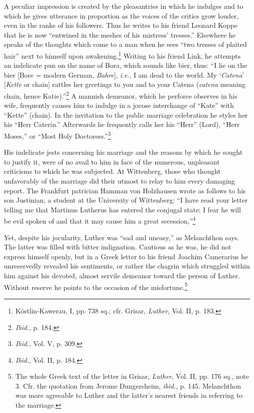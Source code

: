 A peculiar impression is created by the pleasantries in which he
indulges and to which he gives utterance in proportion as the voices
of the critics grow louder, even in the ranks of his followers. Thus
he writes to his friend Leonard Koppe that he is now “entwined in the
meshes of his mistress’ tresses.” Elsewhere he speaks of the thoughts
which come to a man when he sees “two tresses of plaited hair” next
to himself upon awakening.\footnote
{Köstlin-Kawerau, I, pp. 738 sq.; cfr. Grisar, \textit{Luther}, Vol. II, p. 183.}
Writing to his friend Link, he attempts an
indelicate pun on the name of Bora, which sounds like
bier, thus: “I lie on the bier [Bore = modern German, \textit{Bahre}], \textit{i.e.},
I am dead to the world. My ‘\textit{Catena}’ [\textit{Kette} or chain] rattles her
greetings to you and to your Catena (\textit{catena} meaning chain, hence
Katie).”\footnote{\textit{Ibid.}, p. 184.}
A mannish demeanor, which he perforce observes in his
wife, frequently causes him to indulge in a jocose interchange of
“Kate” with “Kette” (chain). In the invitation to the public marriage
celebration he styles her his “Herr Caterin.” Afterwards he
frequently calls her his “Herr” (Lord), “Herr Moses,” or “Most
Holy Doctoress.”\footnote{\textit{Ibid.}, Vol. V, p. 309.}

His indelicate jests concerning his marriage and the reasons by
which he sought to justify it, were of no avail to him in face of
the numerous, unpleasant criticisms to which he was subjected. At
Wittenberg, those who thought unfavorably of the marriage did
their utmost to relay to him every damaging report. The Frankfurt
patrician Hamman von Holzhausen wrote as follows to his son Justinian,
a student at the University of Wittenberg: “I have read your
letter telling me that Martinus Lutherus has entered the conjugal
state; I fear he will be evil spoken of and that it may cause him a great
secession,”\footnote{\textit{Ibid.}, Vol. II, p. 184.}

Yet, despite his jocularity, Luther was “sad and uneasy,” as Melanchthon
says. The latter was filled with bitter indignation. Cautious as he was,
he did not express himself openly, but in a Greek
letter to his friend Joachim Camerarius he unreservedly revealed his
sentiments, or rather the chagrin which struggled within him against
his devoted, almost servile demeanor toward the person of Luther.
Without reserve he points to the occasion of the misfortune.\footnote
{The whole Greek text of the letter in Grisar, \textit{Luther}, Vol. II, pp. 176 sq., note 3.
Cfr. the quotation from Jerome Dungersheim, \textit{ibid.}, p. 145. Melanchthon was more
agreeable to Luther and the latter’s nearest friends in referring to the marriage.}

